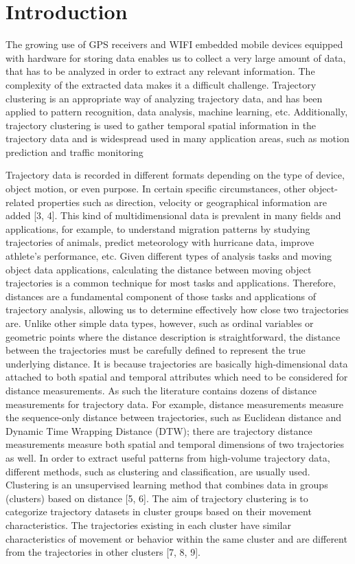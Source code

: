 \documentclass[a4paper, 12pt]{article}
\begin{document}



\section{Introduction}
The growing use of GPS receivers and WIFI embedded mobile devices equipped with hardware for storing data enables us to collect a very large amount of data, that has to be analyzed in order to extract any relevant information. The complexity of the extracted data makes it a difficult challenge. Trajectory clustering is an appropriate way of analyzing trajectory data, and has been applied to pattern recognition, data analysis, machine learning, etc. Additionally, trajectory clustering is used to gather temporal spatial information in the trajectory data and is widespread used in many application areas, such as motion prediction \cite{chen2010searching} and traffic monitoring \cite{atev2006learning}

Trajectory data is recorded in different formats depending on the type of device, object motion, or even purpose. In certain specific circumstances, other object-related properties such as direction, velocity or geographical information are added [3, 4]. This kind of multidimensional data is prevalent in many fields and applications, for example, to understand migration patterns by studying trajectories of animals, predict meteorology with hurricane data, improve athlete’s performance, etc. Given different types of analysis tasks and moving object data applications, calculating the distance between moving object trajectories is a common technique for most tasks and applications. Therefore, distances are a fundamental component of those tasks and applications of trajectory analysis, allowing us to determine effectively how close two trajectories are. Unlike other simple data types, however, such as ordinal variables or geometric points where the distance description is straightforward, the distance between the trajectories must be carefully defined to represent the true underlying distance. It is because trajectories are basically high-dimensional data attached to both spatial and temporal attributes which need to be considered for distance measurements. As such the literature contains dozens of distance measurements for trajectory data. For example, distance measurements measure the sequence-only distance between trajectories, such as Euclidean distance and Dynamic Time Wrapping Distance (DTW); there are trajectory distance measurements measure both spatial and temporal dimensions of two trajectories as well.
In order to extract useful patterns from high-volume trajectory data, different methods, such as clustering and classification, are usually used. Clustering is an unsupervised learning method that combines data in groups (clusters) based on distance [5, 6]. The aim of trajectory clustering is to categorize trajectory datasets in cluster groups based on their movement characteristics. The trajectories existing in each cluster have similar characteristics of movement or behavior within the same cluster and are different from the trajectories in other clusters [7, 8, 9].
\end{document}
